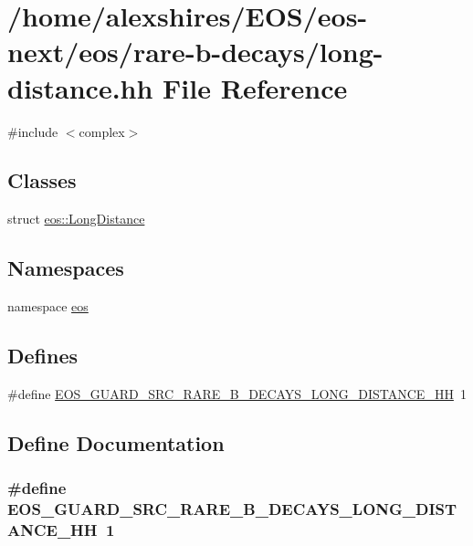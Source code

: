 \hypertarget{long-distance_8hh}{
\section{/home/alexshires/EOS/eos-\/next/eos/rare-\/b-\/decays/long-\/distance.hh File Reference}
\label{long-distance_8hh}
}
{\ttfamily \#include $<$complex$>$}\par
\subsection*{Classes}
\begin{DoxyCompactItemize}
\item 
struct \hyperlink{structeos_1_1LongDistance}{eos::LongDistance}
\end{DoxyCompactItemize}
\subsection*{Namespaces}
\begin{DoxyCompactItemize}
\item 
namespace \hyperlink{namespaceeos}{eos}
\end{DoxyCompactItemize}
\subsection*{Defines}
\begin{DoxyCompactItemize}
\item 
\#define \hyperlink{long-distance_8hh_a6e254a685e9ebb5bade719ae2cb759fc}{EOS\_\-GUARD\_\-SRC\_\-RARE\_\-B\_\-DECAYS\_\-LONG\_\-DISTANCE\_\-HH}~1
\end{DoxyCompactItemize}


\subsection{Define Documentation}
\hypertarget{long-distance_8hh_a6e254a685e9ebb5bade719ae2cb759fc}{
\subsubsection[{EOS\_\-GUARD\_\-SRC\_\-RARE\_\-B\_\-DECAYS\_\-LONG\_\-DISTANCE\_\-HH}]{\setlength{\rightskip}{0pt plus 5cm}\#define EOS\_\-GUARD\_\-SRC\_\-RARE\_\-B\_\-DECAYS\_\-LONG\_\-DISTANCE\_\-HH~1}}
\label{long-distance_8hh_a6e254a685e9ebb5bade719ae2cb759fc}
